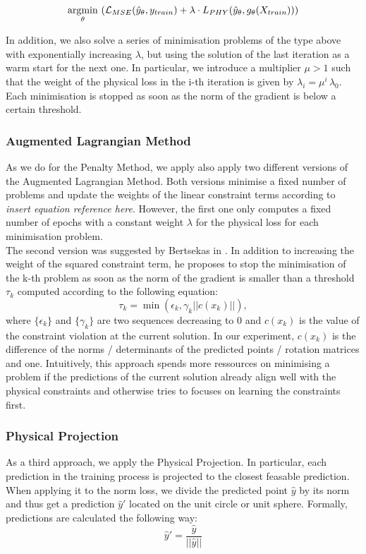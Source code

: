 \[\underset{\theta}{\operatorname*{argmin}} \,\, (\mathcal{L}_{MSE}(\hat{y}_\theta, y_{train}) + \lambda \cdot L_{PHY}(\hat{y}_\theta, g_\theta(X_{train})))\]

In addition, we also solve a series of minimisation problems of the type above with exponentially increasing $\lambda$, but using the solution of the last iteration as a warm start for the next one. In particular, we introduce a multiplier $\mu > 1$ such that the weight of the physical loss in the i-th iteration is given by $\lambda_i = \mu^i \, \lambda_0$. Each minimisation is stopped as soon as the norm of the gradient is below a certain threshold.

\subsubsection{Augmented Lagrangian Method}
\label{exp:alm}
As we do for the Penalty Method, we apply also apply two different versions of the Augmented Lagrangian Method. Both versions minimise a fixed number of problems and update the weights of the linear constraint terms according to \textit{insert equation reference here}. However, the first one only computes a fixed number of epochs with a constant weight $\lambda$ for the physical loss for each minimisation problem.\\
\indent The second version was suggested by Bertsekas in \cite{Yurkiewicz1985ConstrainedOA}. In addition to increasing the weight of the squared constraint term, he proposes to stop the minimisation of the k-th problem as soon as the norm of the gradient is smaller than a threshold $\tau_k$ computed according to the following equation:
\[\tau_k = \min(\epsilon_k, \gamma_k ||c(x_k)||), \]
where $\{\epsilon_k\}$ and $\{\gamma_k \}$ are two sequences decreasing to 0 and $c(x_k)$ is the value of the constraint violation at the current solution. In our experiment, $c(x_k)$ is the difference of the norms / determinants of the predicted points / rotation matrices and one. Intuitively, this approach spends more ressources on minimising a problem if the predictions of the current solution already align well with the physical constraints and otherwise tries to focuses on learning the constraints first.

\subsubsection{Physical Projection}
\label{sec:phys_proj}
As a third approach, we apply the Physical Projection. In particular, each prediction in the training process is projected to the closest feasable prediction. When applying it to the norm loss, we divide the predicted point $\hat{y}$ by its norm and thus get a prediction $\hat{y}'$ located on the unit circle or unit sphere. Formally, predictions are calculated the following way:
\begin{equation}
\hat{y}' = \frac{\hat{y}}{||\hat{y}||}
\end{equation}

